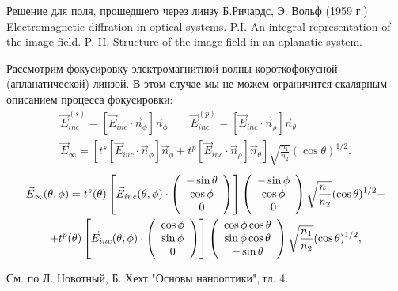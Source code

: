 \documentclass[9pt, compress, xcolor=table]{beamer}
\begin{document}
\begin{frame}{Решение для поля, прошедшего через линзу}
Б.Ричардс, Э. Вольф (1959 г.) Electromagnetic diffration in optical systems. P.I. An integral representation of the image field. P. II. Structure of the image field in an aplanatic system. 

Рассмотрим фокусировку электромагнитной волны \textcolor{red!50!black}{короткофокусной (апланатической) линзой}. В этом случае мы не можем ограничится скалярным описанием процесса фокусировки:
\begin{multline*}
\vec E_{inc}^{(s)} = [\vec E_{inc} \cdot \vec n_{\phi}]\vec n_{\phi}\qquad
\vec E_{inc}^{(p)} = [\vec E_{inc} \cdot \vec n_{\rho}]\vec n_{\theta}\\
\vec E_{\infty} = \left[t^s [\vec E_{inc} \cdot \vec n_{\phi}]\vec n_{\phi} +
t^p [\vec E_{inc} \cdot \vec n_{\rho}]\vec n_{\theta}\right]\sqrt{\frac{n_1}{n_2}} (\cos \theta)^{1/2}.
\end{multline*}
\begin{multline*}
\vec E_{\infty}(\theta, \phi) = t^s(\theta) \left[ \vec E_{inc}(\theta, \phi)\cdot
\left(\array{c} -\sin \theta
\\ \cos \phi \\ 0 \endarray\right)\right] \left(\array{c}
-\sin \phi \\ \cos \phi \\ 0 \endarray\right) \sqrt{\frac{n_1}{n_2}} (\cos \theta)^{1/2} +
\\ + t^p(\theta) \left[ \vec E_{inc}(\theta, \phi) \cdot \left(\array{c} \cos \phi \\ \sin \phi \\ 0
\endarray\right)\right] \left(\array{c} \cos \phi \cos \theta \\ \sin \phi \cos \theta \\ -\sin \theta \endarray\right)
\sqrt{\frac{n_1}{n_2}} (\cos \theta)^{1/2},
\end{multline*}

\scriptsize{См. по Л. Новотный, Б. Хехт "Основы нанооптики", гл. 4.}
\end{frame}
\end{document}
